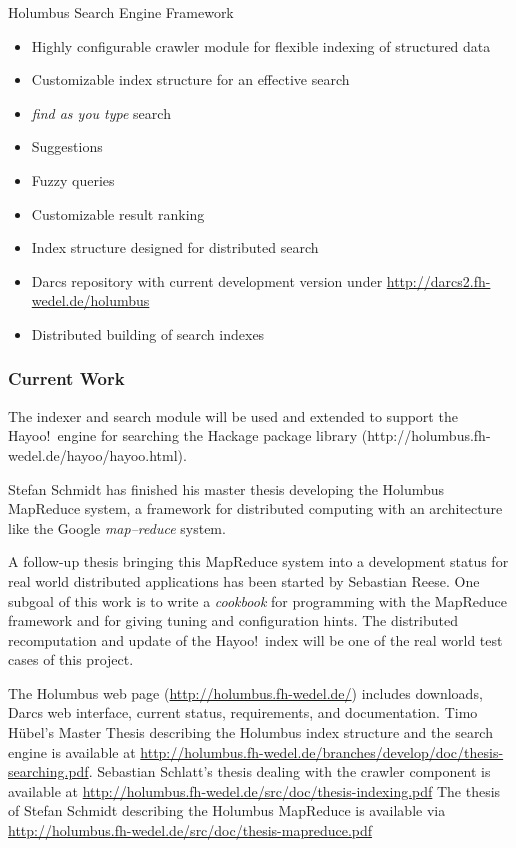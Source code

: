 \begin{hcarentry}[updated]{Holumbus Search Engine Framework}
\begin{itemize}
\item Highly configurable crawler module for flexible indexing of structured data
\item Customizable index structure for an effective search
\item {\em find as you type} search
\item Suggestions
\item Fuzzy queries
\item Customizable result ranking
\item Index structure designed for distributed search
\item Darcs repository with current development version under
  \url{http://darcs2.fh-wedel.de/holumbus}
\item Distributed building of search indexes
\end{itemize}

\subsubsection*{Current Work}

The indexer and search module will be used and extended
to support the Hayoo!\ engine for searching the Hackage package library
(http://holumbus.fh-wedel.de/hayoo/hayoo.html).

Stefan Schmidt has finished his master thesis developing
the Holumbus MapReduce system,  a
framework for distributed computing with an architecture
like the Google
{\em map--reduce} system.

A follow-up thesis bringing this
MapReduce system into a development status for real world
distributed applications has been started by Sebastian Reese.
One subgoal of this work is to write a {\em cookbook}
for programming with the MapReduce framework and for giving
tuning and configuration hints.
The distributed recomputation and update of the Hayoo!\ index will
be one of the real world test cases of this project.

\FurtherReading

The Holumbus web page
(\url{http://holumbus.fh-wedel.de/})
includes downloads, Darcs web interface, current status, requirements, 
and documentation.
Timo H\"ubel's Master Thesis describing the Holumbus index structure and
the search engine is available at
\url{http://holumbus.fh-wedel.de/branches/develop/doc/thesis-searching.pdf}.
Sebastian Schlatt's thesis dealing with the crawler component is
available at
\url{http://holumbus.fh-wedel.de/src/doc/thesis-indexing.pdf}
The thesis of Stefan Schmidt describing the Holumbus MapReduce is
available via \url{http://holumbus.fh-wedel.de/src/doc/thesis-mapreduce.pdf}
\end{hcarentry}
